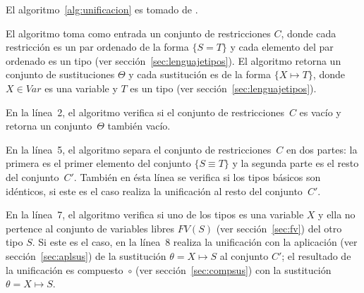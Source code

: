 \documentclass{article}
\theoremstyle{definition}
\begin{document}
El algoritmo~\ref{alg:unificacion} es tomado de
\textcite{pierce-2002}.

\begin{algorithm}[h!]
  \DontPrintSemicolon
  \LinesNumbered
  \caption{$unify(C)$}\label{alg:unificacion}
\end{algorithm}

El algoritmo toma como entrada un conjunto de restricciones $C$, donde
cada restricción es un par ordenado de la forma $\{ S = T \}$ y cada
elemento del par ordenado es un tipo (ver
sección~\ref{sec:lenguajetipos}). El algoritmo retorna un conjunto de
sustituciones $\Theta$ y cada sustitución es de la forma
$\{ X \mapsto T\}$, donde $X \in Var$ es una variable y $T$ es un tipo
(ver sección~\ref{sec:lenguajetipos}).

En la línea~2, el algoritmo verifica si el conjunto de
restricciones~$C$ es vacío y retorna un conjunto~$\Theta$ también
vacío.

En la línea~5, el algoritmo separa el conjunto de restricciones~$C$ en
dos partes: la primera es el primer elemento del conjunto
$\{ S \equiv T \}$ y la segunda parte es el resto del
conjunto~$C'$. También en ésta línea se verifica si los tipos básicos
son idénticos, si este es el caso realiza la unificación al resto del
conjunto~$C'$.

En la línea~7, el algoritmo verifica si uno de los tipos es una
variable $X$ y ella no pertence al conjunto de variables libres
$FV(S)$ (ver sección~\ref{sec:fv}) del otro tipo $S$. Si este es el
caso, en la línea~8 realiza la unificación con la aplicación (ver
sección~\ref{sec:aplsus}) de la sustitución $\theta = X \mapsto S$ al
conjunto $C'$; el resultado de la unificación es compuesto~$\circ$
(ver sección~\ref{sec:compsus}) con la sustitución
$\theta = X \mapsto S$.
\end{document}
